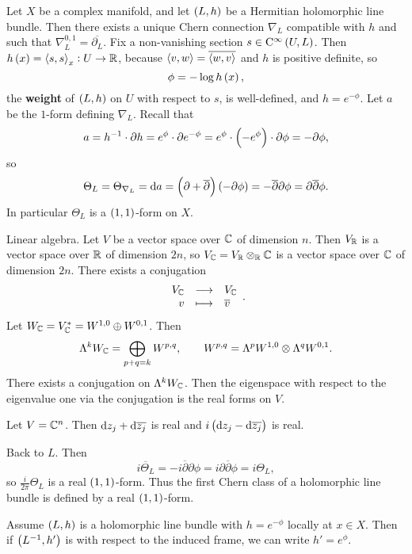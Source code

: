 Let $ X $ be a complex manifold, and let $ \br{L, h} $ be a Hermitian holomorphic line bundle. Then there exists a unique Chern connection $ \nabla_L $ compatible with $ h $ and such that $ \nabla_L^{0, 1} = \overline{\partial_L} $. Fix a non-vanishing section $ s \in \C^\infty\br{U, L} $. Then $ h\br{x} = \abr{s, s}_x : U \to \RR $, because $ \left\langle v, w \right\rangle = \overline{\left\langle w, v \right\rangle} $ and $ h $ is positive definite, so
$$ \phi = -\log h\br{x}, $$
the \textbf{weight} of $ \br{L, h} $ on $ U $ with respect to $ s $, is well-defined, and $ h = e^{-\phi} $. Let $ a $ be the $ 1 $-form defining $ \nabla_L $. Recall that
$$ a = h^{-1} \cdot \partial h = e^\phi \cdot \partial e^{-\phi} = e^\phi \cdot \br{-e^{\phi}} \cdot \partial\phi = -\partial\phi, $$
so
$$ \Theta_L = \Theta_{\nabla_L} = \d a = \br{\partial + \overline{\partial}}\br{-\partial\phi} = -\overline{\partial}\partial\phi = \partial\overline{\partial}\phi. $$
In particular $ \Theta_L $ is a $ \br{1, 1} $-form on $ X $.

\begin{remark*}
Linear algebra. Let $ V $ be a vector space over $ \mathbb{C} $ of dimension $ n $. Then $ V_{\mathbb{R}} $ is a vector space over $ \mathbb{R} $ of dimension $ 2n $, so $ V_{\mathbb{C}} = V_{\mathbb{R}} \otimes_{\mathbb{R}} \mathbb{C} $ is a vector space over $ \mathbb{C} $ of dimension $ 2n $. There exists a conjugation
$$ \function{V_\CC}{V_\CC}{v}{\overline{v}}. $$
Let $ W_{\mathbb{C}} = V_{\mathbb{C}}^* = W^{1, 0} \oplus W^{0, 1} $. Then
$$ \Lambda^kW_{\mathbb{C}} = \bigoplus_{p + q = k} W^{p, q}, \qquad W^{p, q} = \Lambda^pW^{1, 0} \otimes \Lambda^qW^{0, 1}. $$
There exists a conjugation on $ \Lambda^kW_{\mathbb{C}} $. Then the eigenspace with respect to the eigenvalue one via the conjugation is the real forms on $ V $.
\end{remark*}

\begin{example*}
Let $ V = \mathbb{C}^n $. Then $ \mathrm{d} z_j + \mathrm{d}\overline{z_j} $ is real and $ i\br{\d z_j - \d\overline{z_j}} $ is real.
\end{example*}

Back to $ L $. Then
$$ \overline{i\Theta_L} = -i\overline{\partial}\partial\phi = i\partial\overline{\partial}\phi = i\Theta_L, $$
so $ \tfrac{i}{2\pi}\Theta_L $ is a real $ \br{1, 1} $-form. Thus the first Chern class of a holomorphic line bundle is defined by a real $ \br{1, 1} $-form.

\begin{remark}
Assume $ \br{L, h} $ is a holomorphic line bundle with $ h = e^{-\phi} $ locally at $ x \in X $. Then if $ \br{L^{-1}, h'} $ is with respect to the induced frame, we can write $ h' = e^\phi $.
\end{remark}

